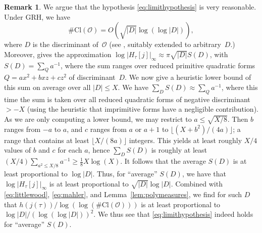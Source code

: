 \documentclass{amsart}
\newcommand{\Fj}{H_\tau[j]}
\newcommand{\Cl}{\mathrm{Cl}}
\newcommand{\mc}{\mathcal}
\numberwithin{equation}{section}
\theoremstyle{definition}
\newtheorem{remark}[equation]{Remark}
\begin{document}
\begin{remark}\label{rem:reasonablehypothesis}
	We argue that the hypothesis \eqref{eq:limithypothesis}
	is very reasonable. Under GRH, we have
	\begin{equation}\label{eq:littlewood}
		\#\Cl(\mc{O}) = O(\sqrt{|D|}\log(\log|D|)),
	\end{equation}
    where $D$ is the discriminant of~$\mc{O}$
    (see \cite[9.Theorem~1 and 11.~on page~371]{littlewood1928}, suitably
    extended to arbitrary~$D$.)
	Moreover,
	\cite[\S 6.2]{enge-morain2002} gives the approximation
	$\log|\Fj|_\infty\approx \pi\sqrt{|D|} S(D)$,
	with $S(D) = \sum_Q a^{-1}$,
	where the sum ranges over
	reduced primitive quadratic forms $Q = ax^2+bxz+cz^2$
	of discriminant~$D$.
	We now give a heuristic lower bound of this sum on average over all $|D|\leq X$.
	We have $\sum_D S(D) \approx \sum_{Q} a^{-1}$,
	where this time the sum is taken over all reduced
	quadratic forms of negative discriminant $>-X$ (using the heuristic that imprimitive forms have a negligible contribution).
	As we are only computing a lower bound, we may restrict
	to $a \leq \sqrt{X/8}$.
	Then $b$ ranges from $-a$ to $a$,
	and $c$ ranges from $a$ or $a+1$ to $\lfloor(X+b^2)/(4a)\rfloor$;
	a range that contains at least $\lfloor X/(8a)\rfloor$
	integers.
	This yields at least roughly $X/4$ values of $b$ and $c$
	for each $a$, hence
	$\sum_D S(D)$ is roughly at least
	$(X/4)\sum_{a^2\leq X/8} a^{-1} \geq \frac{1}{8} X\log(X)$.
	It follows that the average $S(D)$ is at least proportional to $\log|D|$.
	Thus, for ``average'' $S(D)$, we have that
	$\log|\Fj|_\infty$ is at least proportional to $\sqrt{|D|}\log|D|$.
	Combined with \eqref{eq:littlewood}, \eqref{eq:mahler}, and Lemma~\ref{lem:polymeasures},
	we find for such $D$
	that $h(j(\tau))/\log(\log(\#\Cl(\mc{O})))$ is at least proportional
	to $\log|D| / (\log(\log|D|))^2$.
	We thus see that \eqref{eq:limithypothesis}
	indeed holds for ``average'' $S(D)$.
\end{remark}
\end{document}
